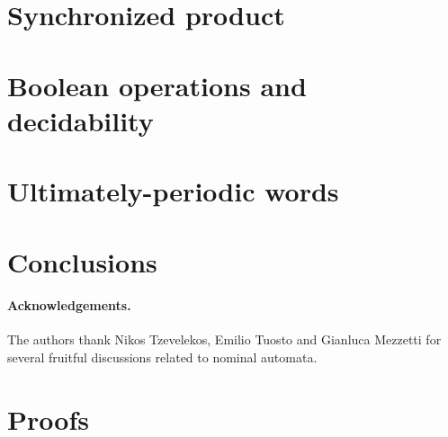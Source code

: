 \documentclass[orivec]{llncs}
\begin{document}
\section{Synchronized product}\label{sec:sync-product}


\section{Boolean operations and decidability}\label{sec:boolean-operations-decidability}

\section{Ultimately-periodic words}\label{sec:up-words}

\section{Conclusions}\label{sec:conclusions}



\paragraph{Acknowledgements.} The authors thank Nikos Tzevelekos, Emilio Tuosto and Gianluca Mezzetti for several fruitful discussions related to nominal automata.





\appendix
\section{Proofs}

\end{document}
